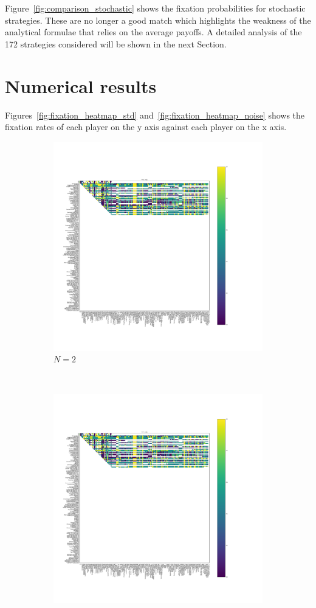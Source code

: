 \documentclass{article}
\begin{document}
Figure~\ref{fig:comparison_stochastic} shows the fixation probabilities for
stochastic strategies. These are no longer a good match which highlights the
weakness of the analytical formulae that relies on the average payoffs. A
detailed analysis of the 172 strategies considered will be shown in the next
Section.

\section{Numerical results}\label{sec:numerical_results}

Figures~\ref{fig:fixation_heatmap_std} and~\ref{fig:fixation_heatmap_noise}
shows the fixation rates of each player on the y axis against each player on the
x axis.

\begin{figure}[!hbtp]
    \centering
    \begin{subfigure}[t]{.3\textwidth}
        \centering
        \includegraphics[width=.8\textwidth]{../img/fixation_heatmap_2_std.pdf}
        \caption{\(N=2\)}
    \end{subfigure}%
    ~
    \begin{subfigure}[t]{.3\textwidth}
        \centering
        \includegraphics[width=.8\textwidth]{../img/fixation_heatmap_4_std.pdf}

\end{subfigure}
\end{figure}
\end{document}
